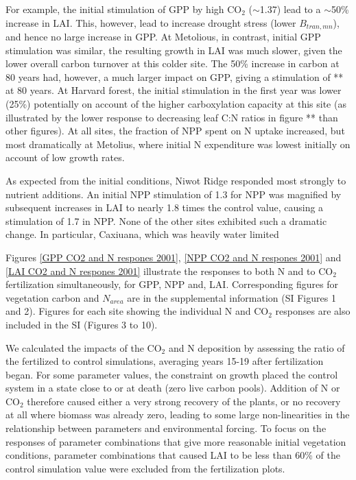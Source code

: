 \documentclass[draft,linenumbers]{agujournal}
\begin{document}
For example, the initial stimulation of GPP by high CO$_{2}$ ($\sim$1.37) lead to a $\sim$50\% increase in LAI. This, however, lead to increase drought stress (lower $B_{tran,mn}$), and hence no large increase in GPP. At Metolious, in contrast, initial GPP stimulation was similar, the resulting growth in LAI was much slower, given the lower overall carbon turnover at this colder site. The 50\% increase in  carbon at 80 years had, however, a much larger impact on GPP, giving a stimulation of ** at 80 years. 
 At Harvard forest, the initial stimulation in the first year was lower (25\%) potentially on account of the higher carboxylation capacity at this site (as illustrated by the lower response to decreasing leaf C:N ratios in figure ** than other figures).  At all sites, the fraction of NPP spent on N uptake increased, but most dramatically at Metolius, where initial N expenditure was lowest initially on account of low growth rates. 
 
As expected from the initial conditions, Niwot Ridge responded most strongly to nutrient additions. An initial NPP stimulation of 1.3 for NPP was magnified by subsequent increases in LAI to nearly 1.8 times the control value, causing a stimulation of 1.7 in NPP. None of the other sites exhibited such a dramatic change. In particular, Caxiuana, which was heavily water limited  




Figures \ref{GPP CO2 and N respones 2001}, \ref{NPP CO2 and N respones 2001} and \ref{LAI CO2 and N respones 2001} illustrate the responses to both N and to CO$_{2}$ fertilization simultaneously, for GPP, NPP and, LAI. Corresponding figures for vegetation carbon and $N_{area}$ are in the supplemental information (SI Figures 1 and 2). Figures for each site showing the individual N and CO$_{2}$ responses are also included in the SI (Figures 3 to 10).

We calculated the impacts of the CO$_{2}$ and N deposition by assessing the ratio of the fertilized to control simulations, averaging years 15-19 after fertilization began. For some parameter values, the constraint on growth placed the control system in a state close to or at death (zero live carbon pools). Addition of N or CO$_{2}$ therefore caused either a very strong recovery of the plants, or no recovery at all where biomass was already zero, leading to some large non-linearities in the relationship between parameters and environmental forcing. To focus on the responses of parameter combinations that give more reasonable initial vegetation conditions, parameter combinations that caused LAI to be less than 60\% of the control simulation value were excluded from the fertilization plots.
\end{document}
